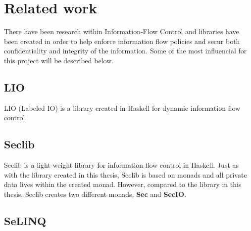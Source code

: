 \section{Related work}
There have been research within Information-Flow Control and libraries have been created in order to help enforce information flow policies and secur both confidentiality and integrity of the information. Some of the most influencial for this project will be described below.
\subsection{LIO}
LIO (Labeled IO) is a library created in Haskell for dynamic information flow control.\cite{lio-2011} 
\subsection{Seclib}
Seclib is a light-weight library for information flow control in Haskell.\cite{seclib, seclib_git} Just as with the library created in this thesis, Seclib is based on monads and all private data lives within the created monad. However, compared to the library in this thesis, Seclib creates two different monads, \textbf{Sec} and \textbf{SecIO}.
\subsection{SeLINQ}
